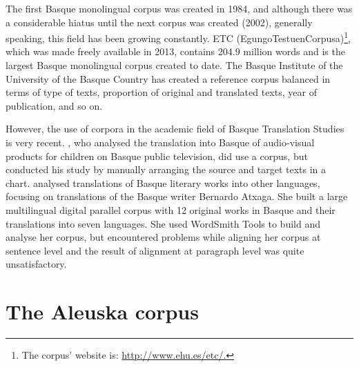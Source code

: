 \documentclass[output=paper]{LSP/langsci}
\begin{document}
The first Basque monolingual corpus was created in 1984, and although there was a considerable hiatus until the next corpus was created (2002), generally speaking, this field has been growing constantly. ETC (EgungoTestuenCorpusa)\footnote{The corpus' website is: \url{http://www.ehu.es/etc/.}}, which was made freely available in 2013, contains 204.9 million words and is the largest Basque monolingual corpus created to date. The Basque Institute of the University of the Basque Country has created a reference corpus balanced in terms of type of texts, proportion of original and translated texts, year of publication, and so on.

However, the use of corpora in the academic field of Basque Translation Studies is very recent. \citet{Barambones2012}, who analysed the translation into Basque of audio-visual products for children on Basque public television, did use a corpus, but conducted his study by manually arranging the source and target texts in a chart. \citet{Manterola2011} analysed translations of Basque literary works into other languages, focusing on translations of the Basque writer Bernardo Atxaga. She built a large multilingual digital parallel corpus with 12 original works in Basque and their translations into seven languages. She used WordSmith Tools \citep{Scott2004} to build and analyse her corpus, but encountered problems while aligning her corpus at sentence level and the result of alignment at paragraph level was quite unsatisfactory.

\section{The Aleuska corpus} \label{sec:3:2}
\end{document}
